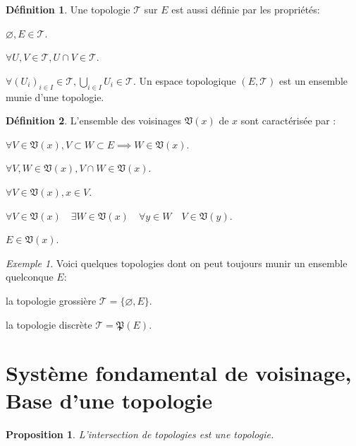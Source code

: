 \documentclass[a4paper, 11pt, french]{book}
\newenvironment{itemise}{\itemize}{\enditemize}
\theoremstyle{plain} %
\newtheorem{proposition}{Proposition}
\theoremstyle{definition} %
\newtheorem{definition}{Définition}
\theoremstyle{remark} %
\newtheorem{exemple}{Exemple}
\newcommand{\1}{\mathds{1}}
\newcommand\vide{\varnothing}
\begin{document}
\begin{definition}
	Une topologie $\mathscr{T}$ sur $E$ est aussi définie par les propriétés:
	\begin{itemise}
		\item $\vide, E\in\mathscr{T}$.
		\item $\forall U, V\in\mathscr{T}, U\cap V\in\mathscr{T}$.
		\item $\forall (U_i)_{i\in I}\in\mathscr{T}, \bigcup_{i\in I}U_i\in\mathscr{T}$.
	\end{itemise}
	Un espace topologique $(E, \mathscr{T})$ est un ensemble munie d'une topologie.
\end{definition}

\begin{definition}
	L'ensemble des voisinages $\mathfrak{V}(x)$ de $x$ sont caractérisée par : 
	\begin{itemise}
		\item $\forall V\in\mathfrak{V}(x), V\subset W\subset E\implies W\in\mathfrak{V}(x)$.
		\item $\forall V, W\in\mathfrak{V}(x), V\cap W\in\mathfrak{V}(x)$.
		\item $\forall V\in\mathfrak{V}(x), x\in V$.
		\item $\forall V\in\mathfrak{V}(x)\quad\exists W\in\mathfrak{V}(x)\quad\forall y\in W\quad V\in\mathfrak{V}(y)$.
		\item $E\in\mathfrak{V}(x)$.
	\end{itemise}
\end{definition}

\begin{exemple}
	Voici quelques topologies dont on peut toujours munir un ensemble quelconque $E$:
	\begin{itemise}
		\item la topologie grossière $\mathscr{T}=\{\vide, E\}$.
		\item la topologie discrète $\mathscr{T}=\mathfrak{P}(E)$.
	\end{itemise}
\end{exemple}

\section{Système fondamental de voisinage, Base d'une topologie}

\begin{proposition}
	L'intersection de topologies est une topologie.
\end{proposition}
\end{document}
